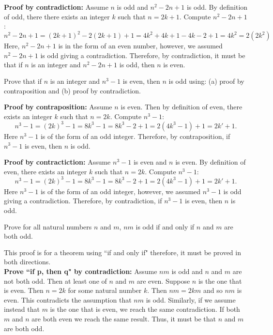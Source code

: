 \begin{questions}
\begin{solution}
    \medskip
    \textbf{Proof by contradiction:} Assume $n$ is odd and $n^2 - 2n + 1$ is
    odd.  By definition of odd, there there exists an
    integer $k$ such that $n=2k+1$.  Compute $n^2 - 2n + 1$:
    \[ n^2 - 2n + 1 = (2k+1)^2 - 2(2k+ 1) + 1 = 4k^2 + 4k+ 1 - 4k - 2 + 1 = 4k^2 = 2(2k^2) \]
    Here, $n^2 - 2n + 1$ is in the form of an even number, however, we assumed
    $n^2 -2n +1$ is odd giving a contradiction. Therefore, by
    contradiction, it must be that if $n$ is an integer and $n^2 - 2n + 1$ is
    odd, then $n$ is even.
\end{solution}



  Prove that if $n$ is an integer and $n^3 -1$ is even,
then $n$ is odd using: (a) proof by contraposition and (b) proof by
contradiction.
    \ifprintanswers
        \vspace{-10pt}
    \fi
\begin{solution} \textbf{Proof by contraposition:}
  Assume $n$ is even.  Then by definition of even, there exists an integer $k$ such that $n=2k$.  Compute $n^3 - 1$: 
  \[ n^3 - 1 = (2k)^3 - 1 = 8k^3 - 1 = 8k^3 -2 +1 = 2(4k^3 - 1) +1 = 2k' + 1. \]
  Here $n^3 - 1$ is of the form of an odd integer.  Therefore, by contraposition, if $n^3 -1$ is even, then $n$ is odd. 

  \medskip
  \textbf{Proof by contractiction:}
  Assume $n^3 -1$ is even and $n$ is even.  By definition of even, there exists an integer $k$ such that $n=2k$.  Compute $n^3 - 1$: 
  \[ n^3 - 1 = (2k)^3 - 1 = 8k^3 - 1 = 8k^3 -2 +1 = 2(4k^3 - 1) +1 = 2k' + 1. \]
  Here $n^3 - 1$ is of the form of an odd integer, however, we assumed $n^3 -1$ is odd giving a contradiction. Therefore, by contradiction, if $n^3 - 1$ is even, then $n$ is odd.   
\end{solution}




 Prove for all natural numbers $n$ and $m$, $nm$ is odd if
and only if $n$ and $m$ are both odd.
    \ifprintanswers
        \vspace{-10pt}
    \fi
\begin{solution}
     This proof is for a theorem using ``if and only if" therefore,
     it must be proved in both directions.  \\
    \textbf{Prove ``if p, then q" by contradiction:} Assume $nm$ is
    odd and $n$ and $m$ are not both odd.  Then at least one of $n$
    and $m$ are even.  Suppose $n$ is the one that is even. Then
    $n=2k$ for some natural number $k$.  Then $nm = 2km$ and so $nm$
    is even.  This contradicts the assumption that $nm$ is odd.
    Similarly, if we assume instead that $m$ is the one that is even,
    we reach the same contradiction.   If both $m$ and $n$ are both
    even we reach the same result.  Thus, it must be that $n$ and
    $m$ are both odd.


\end{solution}
\end{questions}
